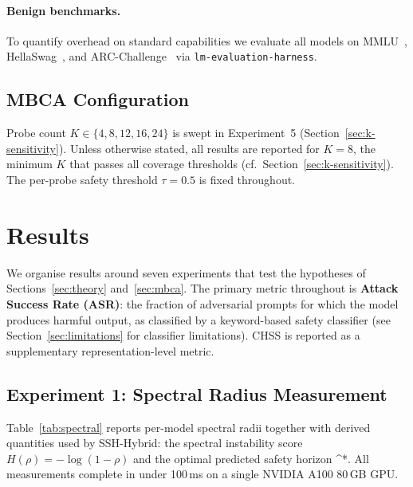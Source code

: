 \documentclass{article}
\newcommand{\deltaStar}{\Delta^{*}}
\begin{document}
\paragraph{Benign benchmarks.}
To quantify overhead on standard capabilities we evaluate all models on MMLU~\citep{hendrycks2021mmlu},
HellaSwag~\citep{zellers2019hellaswag}, and ARC-Challenge~\citep{clark2018arc} via
\texttt{lm-evaluation-harness}.

\subsection{MBCA Configuration}
\label{sec:mbca-config}

Probe count $K \in \{4, 8, 12, 16, 24\}$ is swept in Experiment~5
(Section~\ref{sec:k-sensitivity}).
Unless otherwise stated, all results are reported for $K = 8$, the minimum $K$ that passes
all coverage thresholds (cf.\ Section~\ref{sec:k-sensitivity}).
The per-probe safety threshold $\tau = 0.5$ is fixed throughout.

\section{Results}
\label{sec:results}

We organise results around seven experiments that test the hypotheses of
Sections~\ref{sec:theory} and~\ref{sec:mbca}. The primary metric throughout
is \textbf{Attack Success Rate (ASR)}: the fraction of adversarial prompts for
which the model produces harmful output, as classified by a keyword-based safety
classifier (see Section~\ref{sec:limitations} for classifier limitations).
CHSS is reported as a supplementary representation-level metric.

\subsection{Experiment 1: Spectral Radius Measurement}
\label{sec:exp1}

Table~\ref{tab:spectral} reports per-model spectral radii together with derived
quantities used by SSH-Hybrid: the spectral instability score $H(\rho) = -\log(1-\rho)$
and the optimal predicted safety horizon \deltaStar{}.
All measurements complete in under 100\,ms on a single NVIDIA A100 80\,GB GPU.
\end{document}
